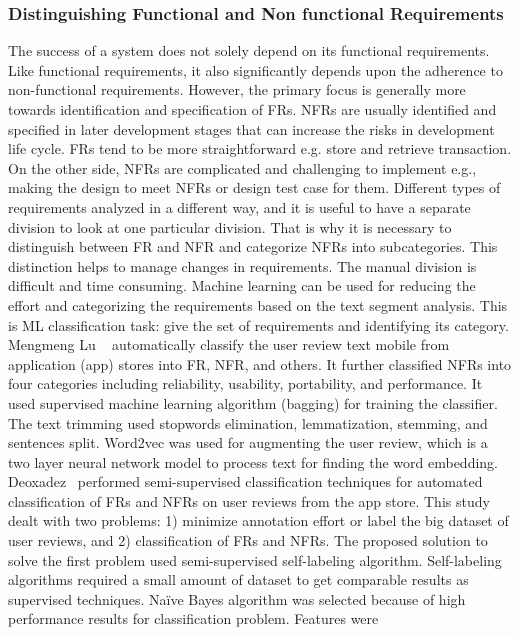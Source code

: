 \subsubsection{Distinguishing Functional and Non functional Requirements}
The success of a system does not solely depend on its functional requirements.
Like functional requirements, it also significantly depends upon the adherence
to non-functional requirements. However, the primary focus is generally more
towards identification and specification of FRs. NFRs are usually identified and
specified in later development stages that can increase the risks in development
life cycle. FRs tend to be more straightforward e.g. store and retrieve
transaction. On the other side, NFRs are complicated and challenging to
implement e.g., making the design to meet NFRs or design test case for them.
Different types of requirements analyzed in a different way, and it is useful to
have a separate division to look at one particular division. That is why it is
necessary to distinguish between FR and NFR and categorize NFRs into
subcategories. This distinction helps to manage changes in requirements. The
manual division is difficult and time consuming. Machine learning can be used
for reducing the effort and categorizing the requirements based on the text
segment analysis. This is ML classification task: give the set of requirements
and identifying its category.\\
Mengmeng Lu \etal~ \cite{Lu:2017} automatically classify the user review text
mobile from application (app) stores  into FR, NFR, and others. It further
classified NFRs into four categories including reliability, usability,
portability, and performance. It used supervised machine learning algorithm
(bagging) for training the classifier. The text trimming used stopwords
elimination, lemmatization, stemming, and sentences split. Word2vec was used for
augmenting the user review, which is a two layer neural network model to process
text for finding the word embedding. Deoxadez
\etal~\cite{Deocadez:2017}performed semi-supervised classification techniques
for automated classification of FRs and NFRs on user reviews from the app store.
This study dealt with two problems: 1) minimize annotation effort or label the
big dataset of user reviews, and 2) classification of FRs and NFRs. The proposed
solution to solve the first problem used semi-supervised self-labeling
algorithm. Self-labeling algorithms required a small amount of dataset to get
comparable results as supervised techniques. Naïve Bayes algorithm was selected
because of high performance results for classification problem. Features were
